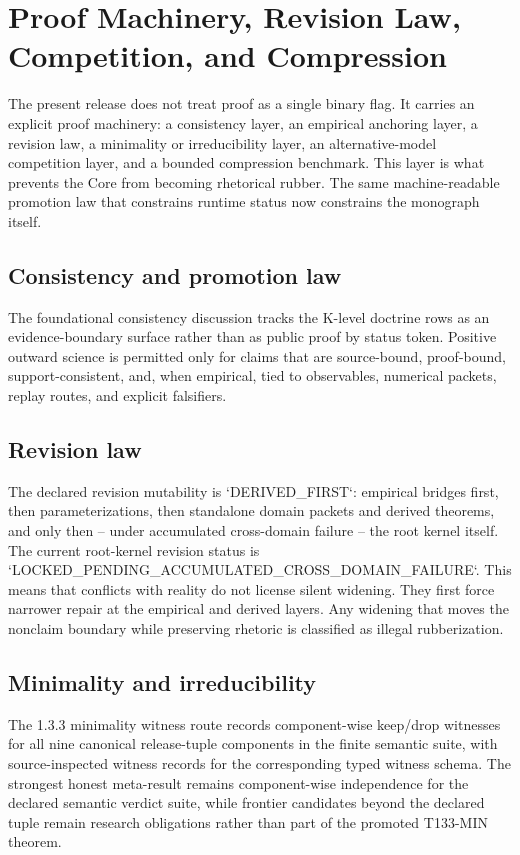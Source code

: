 \section{Proof Machinery, Revision Law, Competition, and Compression}

The present release does not treat proof as a single binary flag. It carries an explicit proof machinery: a consistency layer, an empirical anchoring layer, a revision law, a minimality or irreducibility layer, an alternative-model competition layer, and a bounded compression benchmark.
This layer is what prevents the Core from becoming rhetorical rubber. The same machine-readable promotion law that constrains runtime status now constrains the monograph itself.

\subsection{Consistency and promotion law}
The foundational consistency discussion tracks the K-level doctrine rows as an evidence-boundary surface rather than as public proof by status token.
Positive outward science is permitted only for claims that are source-bound, proof-bound, support-consistent, and, when empirical, tied to observables, numerical packets, replay routes, and explicit falsifiers.

\subsection{Revision law}
The declared revision mutability is `DERIVED\_FIRST`: empirical bridges first, then parameterizations, then standalone domain packets and derived theorems, and only then -- under accumulated cross-domain failure -- the root kernel itself.
The current root-kernel revision status is `LOCKED\_PENDING\_ACCUMULATED\_CROSS\_DOMAIN\_FAILURE`.
This means that conflicts with reality do not license silent widening. They first force narrower repair at the empirical and derived layers. Any widening that moves the nonclaim boundary while preserving rhetoric is classified as illegal rubberization.

\subsection{Minimality and irreducibility}
The 1.3.3 minimality witness route records component-wise keep/drop witnesses for all nine canonical release-tuple components in the finite semantic suite, with source-inspected witness records for the corresponding typed witness schema.
The strongest honest meta-result remains component-wise independence for the declared semantic verdict suite, while frontier candidates beyond the declared tuple remain research obligations rather than part of the promoted T133-MIN theorem.

